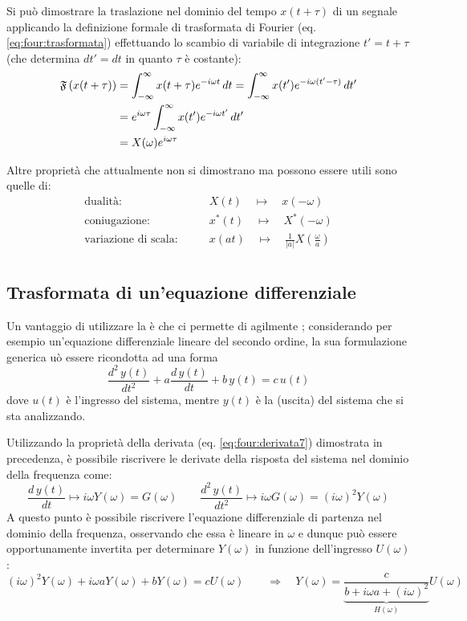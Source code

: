 		\begin{dimostrazione}
			Si può dimostrare la traslazione nel dominio del tempo $x(t + \tau)$ di un segnale applicando la definizione formale di trasformata di Fourier (eq. \ref{eq:four:trasformata}) effettuando lo scambio di variabile di integrazione $t' = t + \tau$ (che determina $dt' = dt$ in quanto $\tau$ è costante):
			\begin{align*}
				\mathfrak F \left(x(t+\tau)\right) & = \int_{-\infty}^\infty x(t+\tau) e^{-i\omega t}\, dt = \int_{-\infty}^\infty x(t') e^{-i\omega (t'-\tau)} \, dt' \\
				& = e^{i\omega \tau} \int_{-\infty}^\infty x(t') e^{-i\omega t'} \, dt' \\
				& = X(\omega) e^{i\omega \tau}
			\end{align*}
		\end{dimostrazione}		
		Altre proprietà che attualmente non si dimostrano ma possono essere utili sono quelle di:
		\begin{align*}
			\textrm{dualità:}& \qquad X(t) \quad \mapsto \quad x(-\omega) \\
			\textrm{coniugazione:}& \qquad x^*(t) \quad \mapsto \quad X^*(-\omega) \\
			\textrm{variazione di scala:}& \qquad x(at) \quad \mapsto \quad \frac 1 {|a|} X\left(\frac \omega a\right) \\
		\end{align*}
		
	\subsection{Trasformata di un'equazione differenziale}
		
			Un vantaggio di utilizzare la  è che ci permette di  agilmente ; considerando per esempio un'equazione differenziale lineare del secondo ordine, la sua formulazione generica uò essere ricondotta ad una  forma
			\[ \frac{d^2\,y(t)}{dt^2} + a \frac{d\, y(t)}{dt} + b\, y(t) = c\,u(t)\]
			dove $u(t)$ è l'ingresso  del sistema, mentre $y(t)$ è la  (uscita) del sistema che si sta analizzando. 
			
			Utilizzando la proprietà della derivata (eq. \ref{eq:four:derivata7}) dimostrata in precedenza, è possibile riscrivere le derivate della risposta del sistema nel dominio della frequenza come:
			\[ \frac{d\,y(t)}{dt}\mapsto i\omega Y(\omega) = G(\omega) \qquad  \frac{d^2\,y(t)}{dt^2}\mapsto i\omega G(\omega) = (i\omega)^2 Y(\omega)  \]
			A questo punto è possibile riscrivere l'equazione differenziale di partenza nel dominio della frequenza, osservando che essa è lineare in $\omega$ e dunque può essere opportunamente invertita per determinare $Y(\omega)$ in funzione dell'ingresso $U(\omega)$:
			\[  (i\omega)^2 Y(\omega) + i\omega a Y(\omega) + bY(\omega) = c U(\omega) \qquad \Rightarrow\quad Y(\omega) = \underbrace{\frac c {b + i\omega a + (i\omega)^2}}_{H(\omega)} U(\omega) \]
			
